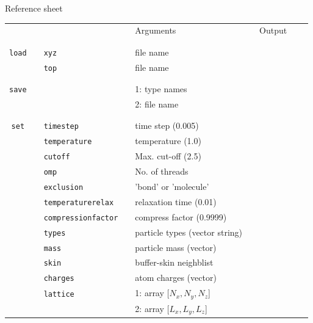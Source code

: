 \documentclass[11pt]{article}
\begin{document}
\begin{center}

  {\huge{Reference sheet}}
  
  \bigskip

  \bigskip
  
  \begin{tabular}{cclclcccc}
    {\color{red}{\textbf{Action}}} && {\color{blue}{Specifier}} && Arguments && Output \\
                                   && && && \\
    \hline
                                   && && && \\
    \verb!load! && \verb!xyz! && file name && \\
    $\mbox{}$ && \verb!top! && file name && \\
                                   && && && \\
    \hline
    && && && \\
    \verb!save! &&  && 1: type names && \\
                &&  && 2: file name && \\
                                   && && && \\
    \hline
                                   && && && \\
    \verb!set! && \verb!timestep! && time step (0.005) && \\
    $\mbox{}$  && \verb!temperature! && temperature (1.0) && \\
    $\mbox{}$  && \verb!cutoff! && Max. cut-off (2.5) && \\
    $\mbox{}$  && \verb!omp! && No. of threads && \\
    $\mbox{}$ && \verb!exclusion! && 'bond' or 'molecule' && \\
    $\mbox{}$ && \verb!temperaturerelax! && relaxation time (0.01) && \\
    $\mbox{}$ && \verb!compressionfactor! && compress factor (0.9999) && \\
    $\mbox{}$ && \verb!types! && particle types (vector string) && \\
    $\mbox{}$ && \verb!mass! && particle mass (vector) && \\
    $\mbox{}$ && \verb!skin! && buffer-skin neighblist && \\
    $\mbox{}$ && \verb!charges! && atom charges (vector) && \\
    $\mbox{}$ && \verb!lattice! && 1: array [$N_x , N_y , N_z$] && \\
    $\mbox{}$ && $\mbox{}$      && 2: array [$L_x, L_y, L_z$] && \\

\end{tabular}
\end{center}
\end{document}
